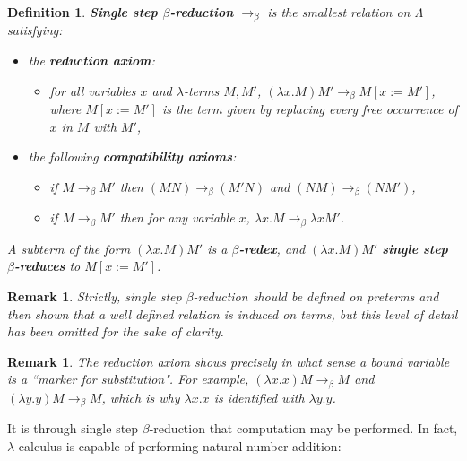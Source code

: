 \documentclass[english,letter paper,12pt,leqno]{article}
\newtheorem{defn}[theorem]{Definition}
\theoremstyle{example}
\newtheorem{remark}[theorem]{Remark}
\numberwithin{equation}{section}
\begin{document}
\begin{defn}
	\textbf{Single step $\beta$-reduction} $\to_\beta$ is the smallest relation on $\Lambda$ satisfying:
	\begin{itemize}
		\item the \textbf{reduction axiom}:
		\begin{itemize}
			\item for all variables $x$ and $\lambda$-terms $M,M'$, $(\lambda x. M)M' \to_\beta M[x := M']$, where $M[x:= M']$ is the term given by replacing every free occurrence of $x$ in $M$ with $M'$,
		\end{itemize}
		\item the following \textbf{compatibility axioms}:
		\begin{itemize}
			\item if $M \to_\beta M'$ then $(MN) \to_\beta (M'N)$ and $(NM) \to_\beta (NM')$,
			\item if $M \to_\beta M'$ then for any variable $x$, $\lambda x. M \to_\beta \lambda x M'$.
		\end{itemize}
	\end{itemize}
	A subterm of the form $(\lambda x. M)M'$ is a \textbf{$\beta$-redex}, and $(\lambda x. M)M'$ \textbf{single step $\beta$-reduces} to $M[x := M']$.
\end{defn}
\begin{remark}
	Strictly, single step $\beta$-reduction should be defined on preterms and then shown that a well defined relation is induced on terms, but this level of detail has been omitted for the sake of clarity.
\end{remark}
\begin{remark}
	\label{markersforsubstitution}
	The reduction axiom shows precisely in what sense a bound variable is a ``marker for substitution". For example, $(\lambda x.x)M \to_\beta M$ and $(\lambda y.y)M \to_\beta M$, which is why $\lambda x.x$ is identified with $\lambda y.y$.
\end{remark}
It is through single step $\beta$-reduction that computation may be performed. In fact, $\lambda$-calculus is capable of performing natural number addition:
\end{document}
